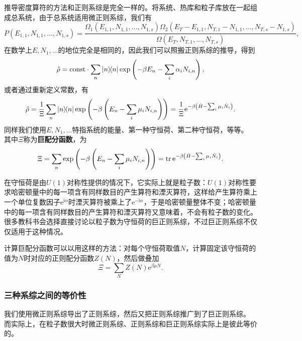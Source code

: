 \documentclass[hyperref, UTF8, a4paper]{ctexart}
\newcommand*{\ii}{\mathrm{i}}
\newcommand*{\ee}{\mathrm{e}}
\newcommand*{\const}{\mathrm{const}}
\begin{document}
推导密度算符的方法和正则系综是完全一样的。将系统、热库和粒子库放在一起组成总系统，由于总系统适用微正则系综，我们有
\[
    P(E_{1,1}, N_{1,1}, \ldots, N_{1,s}) = \frac{\Omega_1(E_{1,1}, N_{1,1}, \ldots, N_{1,s})\Omega_2(E_T-E_{1,1}, N_{T,1}-N_{1,1}, \ldots, N_{T,s}-N_{1,s})}{\Omega(E_T, N_{T,1}, \ldots, N_{T,s})},
\]
在数学上$E,N_1,\ldots$的地位完全是相同的，因此我们可以照搬正则系综的推导，得到
\[
    \hat{\rho} = \const \cdot \sum_n \dyad{n} \exp\left(-\beta E_n - \sum_i \alpha_i N_{i,n}\right),
\]
或者通过重新定义常数，有
\begin{equation}
    \hat{\rho} = \frac{1}{\Xi} \sum_n \dyad{n} \exp \left(-\beta \left(E_n - \sum_i \mu_i N_{i,n}\right)\right) = \frac{1}{\Xi} \ee^{- \beta \left( \hat{H} - \sum_i \mu_i \hat{N}_i \right) }.
    \label{eq:grand-canonical-ensemble-density-operator}
\end{equation}
同样我们使用$E,N_1,\ldots$特指系统的能量、第一种守恒荷、第二种守恒荷，等等。
其中$\Xi$称为\textbf{巨配分函数}，为
\begin{equation}
    \Xi =  \sum_n \exp \left(-\beta \left(E_n - \sum_i \mu_i N_{i,n}\right)\right) = \trace \ee^{- \beta \left( \hat{H} - \sum_i \mu_i \hat{N}_i \right) }.
\end{equation}

在守恒荷是由$U(1)$对称性提供的情况下，它实际上就是粒子数：$U(1)$对称性要求哈密顿量中的每一项含有同样数目的产生算符和湮灭算符，这样给产生算符乘上一个单位复数因子$\ee^{\ii \alpha}$时湮灭算符被乘上了$\ee^{ - \ii \alpha}$，于是哈密顿量整体不变；哈密顿量中的每一项含有同样数目的产生算符和湮灭算符又意味着，不会有粒子数的变化。
很多教科书会选择直接讨论以粒子数为守恒荷的巨正则系综，不过巨正则系综不仅仅适用于这种情况。

计算巨配分函数可以以用这样的方法：对每个守恒荷取值$N$，计算固定该守恒荷的值为$N$时对应的正则配分函数$Z(N)$，然后做叠加
\begin{equation}
    \Xi = \sum_{N} Z(N) \ee^{\beta \mu N}.
\end{equation}

\subsubsection{三种系综之间的等价性}

我们使用微正则系综导出了正则系综，然后又把正则系综推广到了巨正则系综。
而实际上，在粒子数很大时微正则系综、正则系综和巨正则系综实际上是彼此等价的。
\end{document}
